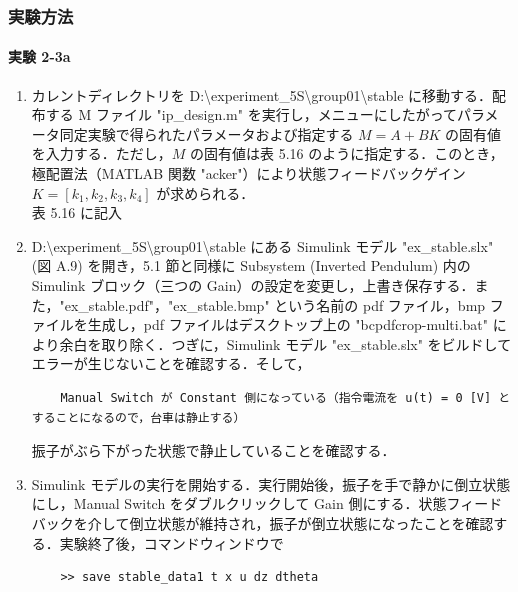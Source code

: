 \subsubsection{実験方法}

\paragraph{実験 2-3a}
\begin{enumerate}
  \item カレントディレクトリを D:\textbackslash experiment\_5S\textbackslash group01\textbackslash stable に移動する．配布する M ファイル "ip\_design.m" を実行し，メニューにしたがってパラメータ同定実験で得られたパラメータおよび指定する \( M = A + BK \) の固有値を入力する．ただし，\( M \) の固有値は表 5.16 のように指定する．このとき，極配置法（MATLAB 関数 "acker"）により状態フィードバックゲイン \( K = [k_1, k_2, k_3, k_4] \) が求められる．\\
        表 5.16 に記入
        
  \item D:\textbackslash experiment\_5S\textbackslash group01\textbackslash stable にある Simulink モデル "ex\_stable.slx" (図 A.9) を開き，5.1 節と同様に Subsystem (Inverted Pendulum) 内の Simulink ブロック（三つの Gain）の設定を変更し，上書き保存する．また，"ex\_stable.pdf"，"ex\_stable.bmp" という名前の pdf ファイル，bmp ファイルを生成し，pdf ファイルはデスクトップ上の "bcpdfcrop-multi.bat" により余白を取り除く．つぎに，Simulink モデル "ex\_stable.slx" をビルドしてエラーが生じないことを確認する．そして，
        
        \begin{tcolorbox}[colback=gray!5!white,colframe=gray!75!black]
          \begin{lstlisting}
    Manual Switch が Constant 側になっている（指令電流を u(t) = 0 [V] とすることになるので，台車は静止する）
    \end{lstlisting}
        \end{tcolorbox}
        
        振子がぶら下がった状態で静止していることを確認する．
        
  \item Simulink モデルの実行を開始する．実行開始後，振子を手で静かに倒立状態にし，Manual Switch をダブルクリックして Gain 側にする．状態フィードバックを介して倒立状態が維持され，振子が倒立状態になったことを確認する．実験終了後，コマンドウィンドウで
        
        \begin{tcolorbox}[colback=gray!5!white,colframe=gray!75!black]
          \begin{lstlisting}
    >> save stable_data1 t x u dz dtheta
    \end{lstlisting}
        \end{tcolorbox}
        

\end{enumerate}
